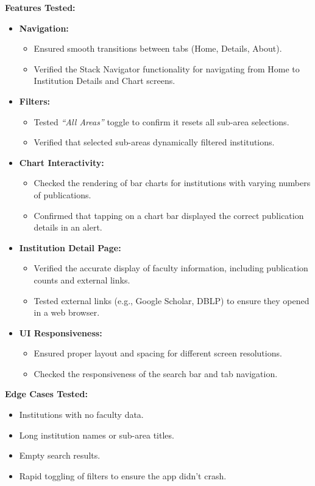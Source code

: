\documentclass[12pt]{article}
\begin{document}
\textbf{Features Tested:}
\begin{itemize}
    \item \textbf{Navigation:}
    \begin{itemize}
        \item Ensured smooth transitions between tabs (Home, Details, About).
        \item Verified the Stack Navigator functionality for navigating from Home to Institution Details and Chart screens.
    \end{itemize}
    \item \textbf{Filters:}
    \begin{itemize}
        \item Tested \textit{``All Areas''} toggle to confirm it resets all sub-area selections.
        \item Verified that selected sub-areas dynamically filtered institutions.
    \end{itemize}
    \item \textbf{Chart Interactivity:}
    \begin{itemize}
        \item Checked the rendering of bar charts for institutions with varying numbers of publications.
        \item Confirmed that tapping on a chart bar displayed the correct publication details in an alert.
    \end{itemize}
    \item \textbf{Institution Detail Page:}
    \begin{itemize}
        \item Verified the accurate display of faculty information, including publication counts and external links.
        \item Tested external links (e.g., Google Scholar, DBLP) to ensure they opened in a web browser.
    \end{itemize}
    \item \textbf{UI Responsiveness:}
    \begin{itemize}
        \item Ensured proper layout and spacing for different screen resolutions.
        \item Checked the responsiveness of the search bar and tab navigation.
    \end{itemize}
\end{itemize}

\textbf{Edge Cases Tested:}
\begin{itemize}
    \item Institutions with no faculty data.
    \item Long institution names or sub-area titles.
    \item Empty search results.
    \item Rapid toggling of filters to ensure the app didn’t crash.
\end{itemize}
\end{document}
